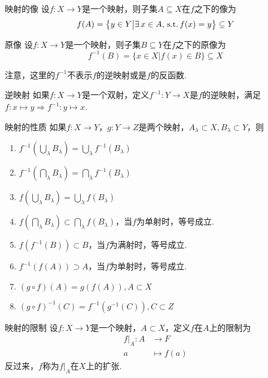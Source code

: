 \begin{definition}{映射的像}
    设$f:X\to Y$是一个映射，则子集$A\subseteq X$在$f$之下的像为
    \[f(A)=\big\{y\in Y\big|\exists\, x\in A,\,\operatorname{\text{s.t.}} f(x)=y \big\}\subseteq Y\]
\end{definition}

\begin{definition}{原像}
    设$f:X\to Y$是一个映射，则子集$B\subseteq Y$在$f$之下的原像为
    \[f^{-1}(B)=\big\{x\in X\big|f(x)\in B \big\}\subseteq X\]
\end{definition}

\begin{note}
    注意，这里的$f^{-1}$不表示$f$的逆映射或是$f$的反函数.
\end{note}

\begin{definition}{逆映射}
    如果$f:X\to Y$是一个双射，定义$f^{-1}:Y\to X$是$f$的逆映射，满足$f:x\mapsto y \Rightarrow f^{-1}:y\mapsto x$.
\end{definition}

\begin{proposition}{映射的性质}
    \wideline
    如果$f:X\to Y$，$g:Y\to Z$是两个映射，$A_\lambda\subset X,B_\lambda \subset Y$，则
    \begin{enumerate}
        \item $f^{-1}\left(\bigcup_{\lambda}{B_\lambda}\right)=\bigcup_{\lambda}{f^{-1}(B_\lambda)}$
        \item $f^{-1}\left(\bigcap_{\lambda}{B_\lambda}\right)=\bigcap_{\lambda}{f^{-1}(B_\lambda)}$
        \item $f\left(\bigcup_{\lambda}{B_\lambda}\right)=\bigcup_{\lambda}{f(B_\lambda)}$
        \item $f\left(\bigcap_{\lambda}{B_\lambda}\right)\subset\bigcap_{\lambda}{f(B_\lambda)}$，当$f$为单射时，等号成立.
        \item $f\left(f^{-1}(B)\right)\subset B$，当$f$为满射时，等号成立.
        \item $f^{-1}\left(f(A)\right)\supset A$，当$f$为单射时，等号成立.
        \item $(g\circ f)(A)=g \left(f(A)\right),A\subset X$
        \item $(g\circ f)^{-1}(C)=f^{-1}\left(g^{-1}(C)\right),C\subset Z$
    \end{enumerate}
\end{proposition}


\begin{definition}{映射的限制}
    设$f:X\to Y$是一个映射，$A\subset X$，定义$f$在$A$上的限制为
    \begin{align*}
        f|_A :A &\to F \\
        a &\mapsto f(a)
    \end{align*}
    反过来，$f$称为$f|_A$在$X$上的扩张.
\end{definition}

